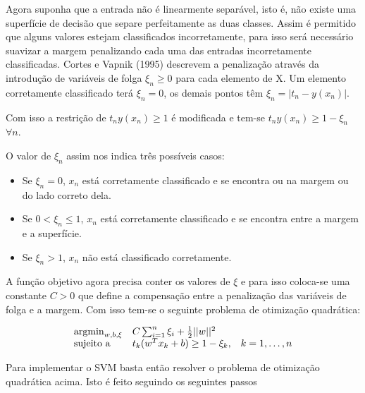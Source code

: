 Agora suponha que a entrada não é linearmente separável, 
isto é, não existe uma superfície de decisão que separe perfeitamente as duas classes. Assim
é permitido que alguns valores estejam classificados incorretamente, para isso
será necessário suavizar a margem penalizando cada uma das entradas incorretamente
classificadas. Cortes e Vapnik (1995)\cite{cortesVapnik1995} descrevem a penalização
através da introdução de variáveis de folga $\xi_n \ge 0$ para cada elemento de X.
Um elemento corretamente classificado terá $\xi_n = 0$, os demais pontos têm
 $\xi_n = |t_n - y(x_n)|$.
 
Com isso a restrição de $t_ny(x_n) \ge 1$ é modificada e tem-se 
$t_ny(x_n) \ge 1 - \xi_n$  $\forall n$.

O valor de $\xi_n$ assim nos indica três possíveis casos:

\begin{itemize}
	\item Se $\xi_n = 0$, $x_n$ está corretamente classificado e se encontra
	ou na margem ou do lado correto dela.
	\item Se $0 < \xi_n \le 1$, $x_n$ está corretamente classificado e se encontra
	entre a margem e a superfície.
	\item Se $\xi_n > 1$, $x_n$ não está classificado corretamente.
\end{itemize}

A função objetivo agora precisa conter os valores de $\xi$ e para isso coloca-se
uma constante $C > 0$ que define a compensação entre a penalização das variáveis de
folga e a margem. Com isso tem-se o seguinte problema de otimização quadrática:

\begin{center}
	\begin{equation}
		\begin{array}{ll@{}ll}
			\argmin_{w, b, \xi} & C\sum_{i = 1}^n\xi_i + \frac{1}{2}||w||^2 &\\
			\text{sujeito a}& t_k(w^Tx_k + b) \ge 1 - \xi_k, && k = 1, \ldots, n
		\end{array}
	\end{equation}
\end{center}

Para implementar o SVM basta então resolver o problema de otimização quadrática
acima. Isto é feito seguindo os seguintes passos

